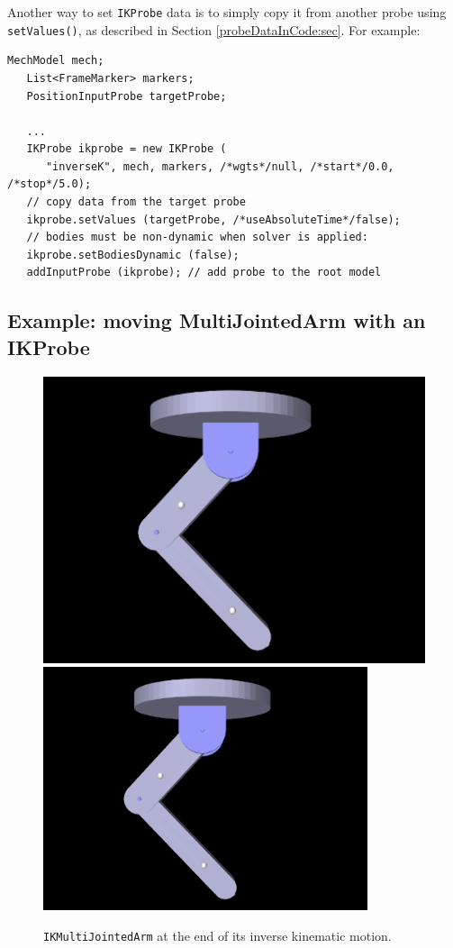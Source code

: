 Another way to set {\tt IKProbe} data is to simply copy it from another probe
using {\tt setValues()}, as described in Section \ref{probeDataInCode:sec}.
For example:
%
\begin{lstlisting}[]
   MechModel mech;
   List<FrameMarker> markers;
   PositionInputProbe targetProbe;

   ...
   IKProbe ikprobe = new IKProbe (
      "inverseK", mech, markers, /*wgts*/null, /*start*/0.0, /*stop*/5.0);
   // copy data from the target probe
   ikprobe.setValues (targetProbe, /*useAbsoluteTime*/false);
   // bodies must be non-dynamic when solver is applied:
   ikprobe.setBodiesDynamic (false);
   addInputProbe (ikprobe); // add probe to the root model
\end{lstlisting}
%

\subsection{Example: moving MultiJointedArm with an IKProbe}

\begin{figure}[ht]
\begin{center}
   \iflatexml 
      \includegraphics[]{images/IKMultiJointedArm} 
   \else 
      \includegraphics[width=3.75in]{images/IKMultiJointedArm} \fi
\end{center}
\caption{{\tt IKMultiJointedArm} at the end of its inverse kinematic motion.}
\label{IKMultiJointedArm:fig}
\end{figure}

